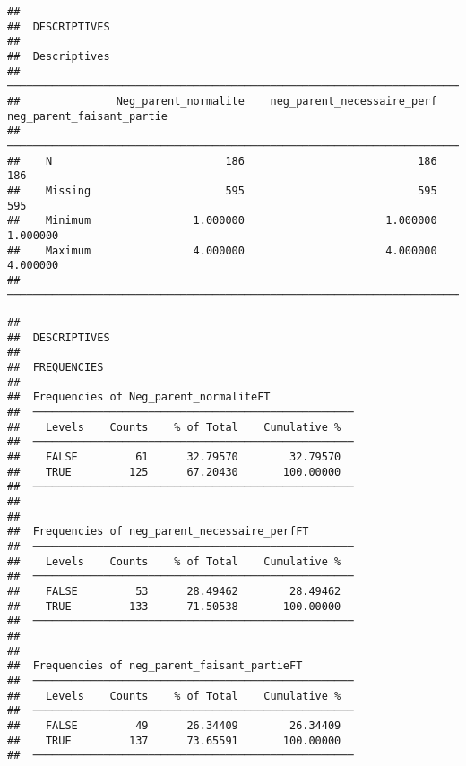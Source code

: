 \documentclass[
]{article}
\begin{document}
\begin{verbatim}
## 
##  DESCRIPTIVES
## 
##  Descriptives                                                                                   
##  ────────────────────────────────────────────────────────────────────────────────────────────── 
##               Neg_parent_normalite    neg_parent_necessaire_perf    neg_parent_faisant_partie   
##  ────────────────────────────────────────────────────────────────────────────────────────────── 
##    N                           186                           186                          186   
##    Missing                     595                           595                          595   
##    Minimum                1.000000                      1.000000                     1.000000   
##    Maximum                4.000000                      4.000000                     4.000000   
##  ──────────────────────────────────────────────────────────────────────────────────────────────
\end{verbatim}

\begin{verbatim}
## 
##  DESCRIPTIVES
## 
##  FREQUENCIES
## 
##  Frequencies of Neg_parent_normaliteFT              
##  ────────────────────────────────────────────────── 
##    Levels    Counts    % of Total    Cumulative %   
##  ────────────────────────────────────────────────── 
##    FALSE         61      32.79570        32.79570   
##    TRUE         125      67.20430       100.00000   
##  ────────────────────────────────────────────────── 
## 
## 
##  Frequencies of neg_parent_necessaire_perfFT        
##  ────────────────────────────────────────────────── 
##    Levels    Counts    % of Total    Cumulative %   
##  ────────────────────────────────────────────────── 
##    FALSE         53      28.49462        28.49462   
##    TRUE         133      71.50538       100.00000   
##  ────────────────────────────────────────────────── 
## 
## 
##  Frequencies of neg_parent_faisant_partieFT         
##  ────────────────────────────────────────────────── 
##    Levels    Counts    % of Total    Cumulative %   
##  ────────────────────────────────────────────────── 
##    FALSE         49      26.34409        26.34409   
##    TRUE         137      73.65591       100.00000   
##  ──────────────────────────────────────────────────
\end{verbatim}
\end{document}
